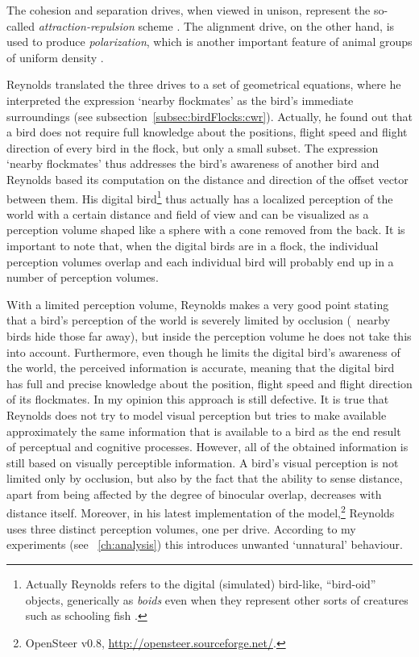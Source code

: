 The cohesion and separation drives, when viewed in unison, represent the so-called \emph{attraction-repulsion} scheme \cite{okubo:1980}. The alignment drive, on the other hand, is used to produce \emph{polarization}, which is another important feature of animal groups of uniform density \cite{parrish:1997a}. 

Reynolds translated the three drives to a set of geometrical equations, where he interpreted the expression `nearby flockmates' as the bird's immediate surroundings (see subsection~\ref{subsec:birdFlocks:cwr}). Actually, he found out that a bird does not require full knowledge about the positions, flight speed and flight direction of every bird in the flock, but only a small subset. The expression `nearby flockmates' thus addresses the bird's awareness of another bird and Reynolds based its computation on the distance and direction of the offset vector between them. His digital bird\footnote{Actually Reynolds refers to the digital (simulated) bird-like, ``bird-oid'' objects, generically as \emph{boids} even when they represent other sorts of creatures such as schooling fish \cite{reynolds:1987}.} thus actually has a localized perception of the world with a certain distance and field of view and can be visualized as a perception volume shaped like a sphere with a cone removed from the back. It is important to note that, when the digital birds are in a flock, the individual perception volumes overlap and each individual bird will probably end up in a number of perception volumes.

With a limited perception volume, Reynolds makes a very good point stating that a bird's perception of the world is severely limited by occlusion (\ie\ nearby birds hide those far away), but inside the perception volume he does not take this into account. Furthermore, even though he limits the digital bird's awareness of the world, the perceived information is accurate, meaning that the digital bird has full and precise knowledge about the position, flight speed and flight direction of its flockmates. In my opinion this approach is still defective. It is true that Reynolds does not try to model visual perception but tries to make available approximately the same information that is available to a bird as the end result of perceptual and cognitive processes. However, all of the obtained information is still based on visually perceptible information. A bird's visual perception is not limited only by occlusion, but also by the fact that the ability to sense distance, apart from being affected by the degree of binocular overlap, decreases with distance itself. Moreover, in his latest implementation of the model,\footnote{OpenSteer v0.8, \href{http://opensteer.sourceforge.net/}{http://opensteer.sourceforge.net/}.} Reynolds uses three distinct perception volumes, one per drive. According to my experiments (see \chaptername~\ref{ch:analysis}) this introduces unwanted `unnatural' behaviour.

